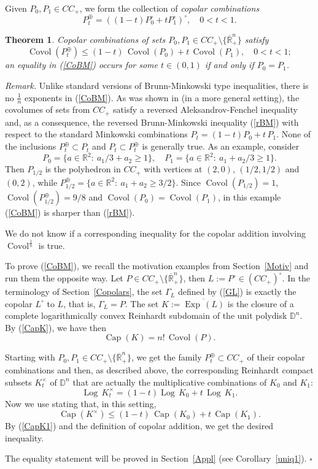 \documentclass[12pt]{article}
\newcommand{\beq}{\begin{equation}}
\newcommand{\eeq}{\end{equation}}
\numberwithin{equation}{section}
\newtheorem{theorem}{Theorem}[section]
\newenvironment{proof}{\medbreak\noindent{\it Proof.}\rm}{\hfill$\square$\rm}
\newcommand{\Covol}{{\operatorname{Covol}}}
\newcommand{\Capa}{{\operatorname{Cap}}}
\newcommand{\Log}{{\operatorname{Log}\,}}
\newcommand{\Exp}{{\operatorname{Exp}\,}}
\newcommand{\D}{{\mathbb D}}
\newcommand{\R}{{\mathbb R}}
\newcommand{\Rnp}{{\mathbb R}_+^n}
\begin{document}
Given $P_0,P_1\in CC_+$, we form the collection of {\it copolar combinations}
\beq\label{copcom} P_t^\oplus=\left((1-t)P_0^\circ+tP_1^\circ\right)^\circ,\quad 0< t< 1.\eeq

\begin{theorem}
\label{theo}
Copolar combinations of sets $P_0,P_1\in CC_+\setminus\{\overline\Rnp\}$ satisfy
\beq\label{CoBM}\Covol(P_t^\oplus)\le (1-t)\,\Covol(P_0)+ t\,\Covol(P_1),\quad 0<t<1;\eeq
an equality in (\ref{CoBM}) occurs for some $t\in (0,1)$ if and only if $P_0=P_1$.
\end{theorem}

{\it Remark.} Unlike standard versions of Brunn-Minkowski type inequalities, there is no $\frac1n$ exponents in (\ref{CoBM}).
As was shown in \cite{KT} (in a more general setting), the covolumes of sets from $CC_+$ satisfy a reversed Aleksandrov-Fenchel inequality and, as a consequence, the reversed Brunn-Minkowski inequality (\ref{rBM}) with respect to the standard Minkowski combinations
$P_t=(1-t)P_0+t\,P_1$. None of the inclusions $ P_t^\oplus\subset P_t$ and $P_t\subset P_t^\oplus$ is generally true. As an example, consider
$$P_0=\{a\in \R^2:\: {a_1}/3+a_2\ge 1\}, \quad P_1=\{a\in \R^2:\: a_1+{a_2}/3\ge 1\}.$$ Then $P_{1/2}$ is the polyhedron in $CC_+$ with vertices at $(2,0)$, $(1/2,1/2)$ and $(0,2)$, while $P_{1/2}^\oplus=\{a\in \R^2:\: a_1+a_2\ge 3/2\}$. Since $\Covol(P_{1/2})=1$, $\Covol(P_{1/2}^\oplus)=9/8$ and $\Covol(P_0)=\Covol(P_1)$, in this example (\ref{CoBM}) is sharper than (\ref{rBM}).

We do not know if a corresponding inequality for the copolar addition involving $\Covol^{\frac1n}$ is true.


\begin{proof}
To prove (\ref{CoBM}), we recall the motivation examples from Section~\ref{Motiv} and run them the opposite way. Let $P\in CC_+\setminus\{\overline\Rnp\}$, then $L:=P^\circ\in (CC_+)^\circ$. In the terminology of Section~\ref{Copolars}, the set $\Gamma_L$ defined by (\ref{GL}) is exactly the copolar $L^\circ$ to $L$, that is, $\Gamma_L=P$.
The set $K:=\overline{\Exp(L)}$
is the closure of a complete logarithmically convex Reinhardt subdomain of the unit polydisk $\D^n$. By (\ref{CapK}), we have then
\beq\label{CapK1} \Capa(K) =n!\, \Covol(P).\eeq

Starting with $P_0,P_1\in CC_+\setminus\{\overline\Rnp\}$, we get the family $P_t^\oplus\subset CC_+$ of their copolar combinations and then, as described above, the corresponding Reinhardt compact subsets $K_t^\times$ of $\D^n$ that are actually the multiplicative combinations of $K_0$ and $K_1$:
 $$\Log K_t^\times= (1-t)\Log K_0+t\,\Log K_1.$$
 Now we use \cite[Thm. 4.3]{R16} stating that, in this setting,
 \beq\label{capin}\Capa(K^\times)\le (1-t)\,\Capa(K_0)+t\,\Capa(K_1).\eeq
By (\ref{CapK1}) and the definition of copolar addition, we get the desired inequality.

The equality statement will be proved in Section~\ref{Appl} (see Corollary~\ref{uniq1}).
\end{proof}
\end{document}
